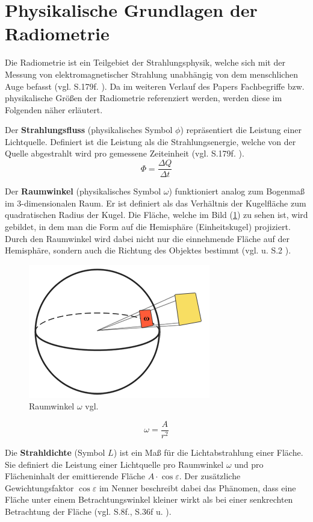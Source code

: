 \documentclass[
  11pt,
  a4paper,
  oneside
  ]{article}
\begin{document}
\section{Physikalische Grundlagen der Radiometrie}\label{sec:radiometrie}
Die Radiometrie ist ein Teilgebiet der Strahlungsphysik, welche sich mit der Messung von elektromagnetischer Strahlung unabhängig von dem menschlichen Auge befasst 
(vgl. S.179f. \cite{Beyerer2016}). Da im weiteren Verlauf des Papers Fachbegriffe bzw. physikalische Größen der Radiometrie referenziert werden, werden diese im Folgenden näher erläutert. 

Der \textbf{Strahlungsfluss} (physikalisches Symbol $\phi$) repräsentiert die Leistung einer Lichtquelle. Definiert ist die Leistung als die Strahlungsenergie, welche von der Quelle abgestrahlt wird pro gemessene Zeiteinheit (vgl. S.179f. \cite{Beyerer2016}). 
\[\Phi =\dfrac{\Delta Q}{\Delta t}\] %

Der \textbf{Raumwinkel} (physikalisches Symbol $\omega$) funktioniert analog zum Bogenmaß im 3-dimensionalen Raum. Er ist definiert als das Verhältnis der Kugelfläche zum quadratischen Radius der Kugel. Die Fläche, welche im Bild
(\ref{fig:img6}) zu sehen ist, wird gebildet, in dem man die Form auf die Hemisphäre (Einheitskugel) projiziert. Durch den Raumwinkel wird dabei nicht nur die einnehmende Fläche auf der Hemisphäre, sondern auch die Richtung des Objektes bestimmt 
(vgl. \cite{learnOpenGL} u. S.2 \cite{irrlichtOrg}). 
\begin{figure}[H]
  \centering
  \includegraphics*[width=0.35 \textwidth]{images/solid_angle.png}
  \caption{Raumwinkel $\omega$ vgl. \cite{learnOpenGL}}
  \label{fig:img6}
\end{figure}
\[\omega =\dfrac{A}{r^{2}}\] %

Die \textbf{Strahldichte} (Symbol $L$) ist ein Maß für die Lichtabstrahlung einer Fläche. Sie definiert die Leistung einer Lichtquelle pro Raumwinkel $\omega$ und pro Flächeninhalt der emittierende Fläche $A\cdot \cos \varepsilon$. Der zusätzliche Gewichtungsfaktor $\cos \varepsilon$ im Nenner beschreibt dabei das Phänomen, dass eine Fläche unter einem Betrachtungswinkel kleiner wirkt als bei einer senkrechten Betrachtung der Fläche 
(vgl. S.8f.\cite{GrundlagenLichtTechnik}, S.36f \cite{radiometrischeGrundbegriffe} u. \cite{vgb,learnOpenGL}).
\end{document}
